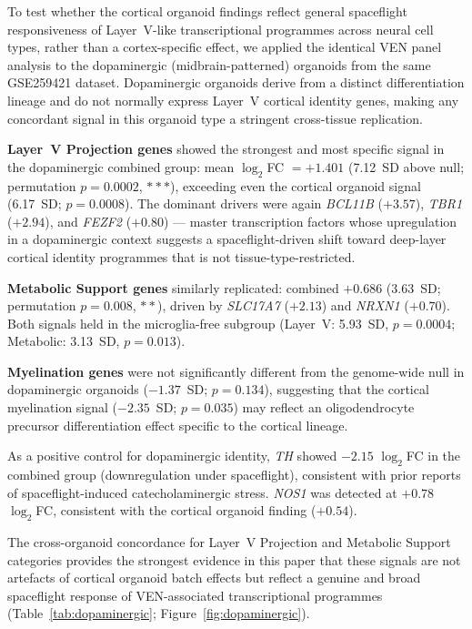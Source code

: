 \documentclass[11pt]{article}
\begin{document}
To test whether the cortical organoid findings reflect general spaceflight
responsiveness of Layer~V-like transcriptional programmes across neural
cell types, rather than a cortex-specific effect, we applied the identical
VEN panel analysis to the dopaminergic (midbrain-patterned) organoids from
the same GSE259421 dataset.
Dopaminergic organoids derive from a distinct differentiation lineage and
do not normally express Layer~V cortical identity genes, making any
concordant signal in this organoid type a stringent cross-tissue
replication.

\textbf{Layer~V Projection genes} showed the strongest and most specific
signal in the dopaminergic combined group: mean $\log_2$FC $= +1.401$
(7.12~SD above null; permutation $p=0.0002$, $***$), exceeding even the
cortical organoid signal (6.17~SD; $p=0.0008$).
The dominant drivers were again \textit{BCL11B} ($+3.57$), \textit{TBR1}
($+2.94$), and \textit{FEZF2} ($+0.80$) --- master transcription factors
whose upregulation in a dopaminergic context suggests a spaceflight-driven
shift toward deep-layer cortical identity programmes that is not
tissue-type-restricted.

\textbf{Metabolic Support genes} similarly replicated: combined $+0.686$
(3.63~SD; permutation $p=0.008$, $**$), driven by \textit{SLC17A7}
($+2.13$) and \textit{NRXN1} ($+0.70$).
Both signals held in the microglia-free subgroup (Layer~V: 5.93~SD,
$p=0.0004$; Metabolic: 3.13~SD, $p=0.013$).

\textbf{Myelination genes} were not significantly different from the
genome-wide null in dopaminergic organoids ($-1.37$~SD; $p=0.134$),
suggesting that the cortical myelination signal ($-2.35$~SD; $p=0.035$)
may reflect an oligodendrocyte precursor differentiation effect specific
to the cortical lineage.

As a positive control for dopaminergic identity, \textit{TH} showed
$-2.15$ $\log_2$FC in the combined group (downregulation under
spaceflight), consistent with prior reports of spaceflight-induced
catecholaminergic stress.
\textit{NOS1} was detected at $+0.78$ $\log_2$FC, consistent with
the cortical organoid finding ($+0.54$).

The cross-organoid concordance for Layer~V Projection and Metabolic
Support categories provides the strongest evidence in this paper that
these signals are not artefacts of cortical organoid batch effects but
reflect a genuine and broad spaceflight response of VEN-associated
transcriptional programmes (Table~\ref{tab:dopaminergic};
Figure~\ref{fig:dopaminergic}).
\end{document}
